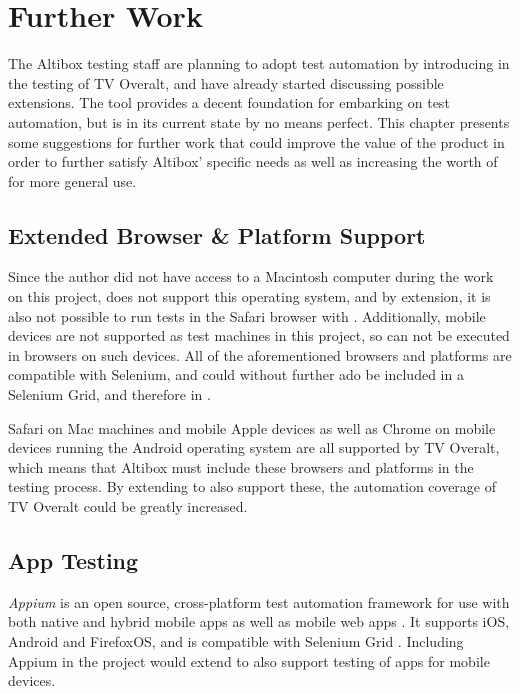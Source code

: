 \section{Further Work}\label{chapters.further_work}
\thispagestyle{plain}

The Altibox testing staff are planning to adopt test automation by introducing \toolname \space in the testing of TV Overalt, and have already started discussing possible extensions. The tool provides a decent foundation for embarking on test automation, but is in its current state by no means perfect. This chapter presents some suggestions for further work that could improve the value of the product in order to further satisfy Altibox' specific needs as well as increasing the worth of \toolname \space for more general use.

\subsection{Extended Browser \& Platform Support}

Since the author did not have access to a Macintosh computer during the work on this project, \toolname \space does not support this operating system, and by extension, it is also not possible to run tests in the Safari browser with \toolname. Additionally, mobile devices are not supported as test machines in this project, so \toolname \space can not be executed in browsers on such devices. All of the aforementioned browsers and platforms are compatible with Selenium, and could without further ado be included in a Selenium Grid, and therefore in \toolname.

Safari on Mac machines and mobile Apple devices as well as Chrome on mobile devices running the Android operating system are all supported by TV Overalt, which means that Altibox must include these browsers and platforms in the testing process. By extending \toolname \space to also support these, the automation coverage of TV Overalt could be greatly increased.
    
\subsection{App Testing}

\emph{Appium} is an open source, cross-platform test automation framework for use with both native and hybrid mobile apps as well as mobile web apps \cite{appium-getting-started}. It supports iOS, Android and FirefoxOS, and is compatible with Selenium Grid \cite{appium-api-reference}. Including Appium in the project would extend \toolname \space to also support testing of apps for mobile devices.

